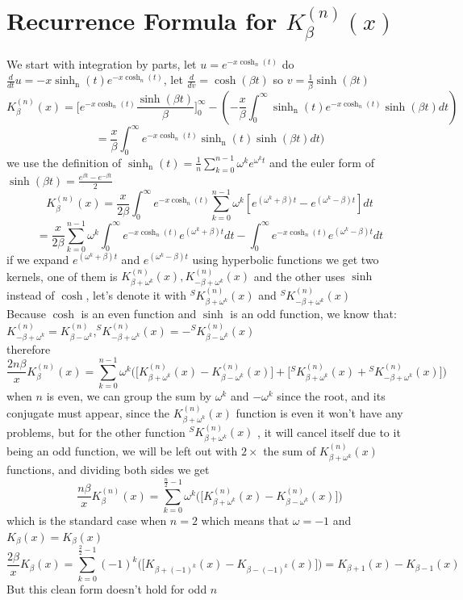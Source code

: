 \documentclass{article}
\newcommand{\NotDefinedsinh}[2]{\operatorname{\sinh_{#1}\text{#2}}}
\newcommand{\NotDefinedcosh}[2]{\operatorname{cosh}_{#1}\text{#2}}
\begin{document}
\section{Recurrence Formula for $K^{(n)}_{\beta}(x)$}
We start with integration by parts, let $u = e^{-x\NotDefinedcosh{n}{}(t)}$ do $\frac{d}{dt} u =-x\NotDefinedsinh{n}{}(t)e^{-x\NotDefinedcosh{n}{}(t)}$, let $\frac{d}{d v} = \cosh(\beta t)$ so $v = \frac{1}{\beta}\sinh(\beta t)$
\[K^{(n)}_{\beta}(x) =\bigg[e^{-x\NotDefinedcosh{n}{}(t)}\frac{\sinh(\beta t)}{\beta}\bigg]^{\infty}_{0}-(-\frac{x}{\beta}\int_{0}^{\infty}\NotDefinedsinh{n}{}(t)e^{-x\NotDefinedcosh{n}{}(t)}\sinh(\beta t)dt )\]
\[=\frac{x}{\beta}\int_{0}^{\infty}e^{-x\NotDefinedcosh{n}{}(t)}\NotDefinedsinh{n}{}(t)\sinh(\beta t)dt ) \]
we use the definition of $\NotDefinedsinh{n}{}(t) = \frac{1}{n} \sum_{k=0}^{n-1} \omega^k e^{\omega^k t}$ and the euler form of $\sinh(\beta t) = \frac{e^{\beta t}-e^{-\beta t}}{2}$
\[K^{(n)}_{\beta}(x)=\frac{x}{2\beta}\int_{0}^{\infty}e^{-x\NotDefinedcosh{n}{}(t)}\sum_{k=0}^{n-1} \omega^k \left[ e^{(\omega^k + \beta)t} - e^{(\omega^k - \beta)t} \right]dt \] 
\[= \frac{x}{2\beta}\sum_{k=0}^{n-1} \omega^k  \int_{0}^{\infty}e^{-x\NotDefinedcosh{n}{}(t)}e^{(\omega^k + \beta)t}dt - \int_{0}^{\infty}e^{-x\NotDefinedcosh{n}{}(t)}e^{(\omega^k - \beta)t} dt \]
if we expand $e^{(\omega^k + \beta)t}$ and $e^{(\omega^k - \beta)t}$ using hyperbolic functions we get two kernels, one of them is $K^{(n)}_{\beta+\omega^k}(x),K^{(n)}_{-\beta+\omega^k}(x)$ and the other uses $\sinh$ instead of $\cosh$, let's denote it with $^{S}K^{(n)}_{\beta+\omega^k}(x)$ and $^{S}K^{(n)}_{-\beta+\omega^k}(x)$\\
Because $\cosh$ is an even function and $\sinh$ is an odd function, we know that:$K^{(n)}_{-\beta + \omega^k} = K^{(n)}_{\beta - \omega^k}$,$^{S}K^{(n)}_{-\beta+\omega^k}(x) = -^{S}K^{(n)}_{\beta-\omega^k}(x)$\\
therefore
\[ \frac{2n\beta}{x} K^{(n)}_{\beta}(x) = \sum_{k=0}^{n-1} \omega^k \bigg( \bigg[ K^{(n)}_{\beta + \omega^k}(x) - K^{(n)}_{\beta - \omega^k}(x) \bigg] + \bigg[{}^{S}K^{(n)}_{\beta+\omega^k}(x) + {}^{S}K^{(n)}_{-\beta+\omega^k}(x) \bigg] \bigg) \]
when $n$ is even, we can group the sum by $\omega^k$ and $-\omega^k$ since the root, and its conjugate must appear, since the $K^{(n)}_{\beta+\omega^k}(x)$ function is even it won't have any problems, but for the other function $^{S}K^{(n)}_{\beta+\omega^k}(x)$ , it will cancel itself due to it being an odd function, we will be left out with $2 \times$ the sum of $K^{(n)}_{\beta+\omega^k}(x)$ functions, and dividing both sides we get
\[ \frac{n\beta}{x} K^{(n)}_{\beta}(x) = \sum_{k=0}^{\frac{n}{2}-1} \omega^k \bigg( \bigg[ K^{(n)}_{\beta + \omega^k}(x) - K^{(n)}_{\beta - \omega^k}(x) \bigg]\bigg)\]
which is the standard case when $n =2$ which means that $\omega = -1$ and $K_{\beta}(x) = K_{\beta}(x)$
\[ \frac{2\beta}{x} K_{\beta}(x) = \sum_{k=0}^{\frac{2}{2}-1} (-1)^k \bigg( \bigg[ K_{\beta + (-1)^k}(x) - K_{\beta - (-1)^k}(x) \bigg]\bigg) =  K_{\beta + 1}(x) - K_{\beta - 1}(x)\]
But this clean form doesn't hold for odd $n$
\end{document}
